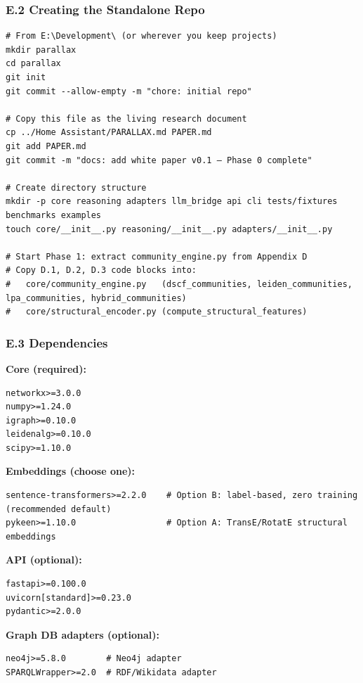 \documentclass[10pt,journal,compsoc]{IEEEtran}
\begin{document}
\subsubsection{E.2 Creating the Standalone Repo}

\begin{lstlisting}
# From E:\Development\ (or wherever you keep projects)
mkdir parallax
cd parallax
git init
git commit --allow-empty -m "chore: initial repo"

# Copy this file as the living research document
cp ../Home Assistant/PARALLAX.md PAPER.md
git add PAPER.md
git commit -m "docs: add white paper v0.1 — Phase 0 complete"

# Create directory structure
mkdir -p core reasoning adapters llm_bridge api cli tests/fixtures benchmarks examples
touch core/__init__.py reasoning/__init__.py adapters/__init__.py

# Start Phase 1: extract community_engine.py from Appendix D
# Copy D.1, D.2, D.3 code blocks into:
#   core/community_engine.py   (dscf_communities, leiden_communities, lpa_communities, hybrid_communities)
#   core/structural_encoder.py (compute_structural_features)
\end{lstlisting}

\subsubsection{E.3 Depend\-encies}

\textbf{Core (required):}
\begin{lstlisting}
networkx>=3.0.0
numpy>=1.24.0
igraph>=0.10.0
leidenalg>=0.10.0
scipy>=1.10.0
\end{lstlisting}

\textbf{Embeddings (choose one):}
\begin{lstlisting}
sentence-transformers>=2.2.0    # Option B: label-based, zero training (recommended default)
pykeen>=1.10.0                  # Option A: TransE/RotatE structural embeddings
\end{lstlisting}

\textbf{API (optional):}
\begin{lstlisting}
fastapi>=0.100.0
uvicorn[standard]>=0.23.0
pydantic>=2.0.0
\end{lstlisting}

\textbf{Graph DB adapters (optional):}
\begin{lstlisting}
neo4j>=5.8.0        # Neo4j adapter
SPARQLWrapper>=2.0  # RDF/Wikidata adapter
\end{lstlisting}
\end{document}
